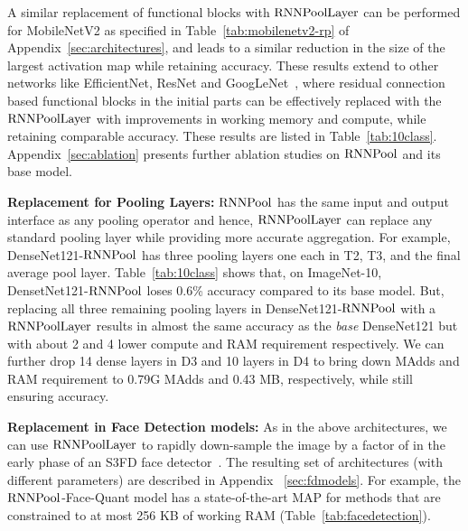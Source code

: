\documentclass[10pt]{article}
\newcommand{\rpool}{\ensuremath{{\rm RNNPool}}\xspace}
\newcommand{\rpoollayer}{\ensuremath{{\rm RNNPoolLayer}}\xspace}
\begin{document}
A similar replacement of functional blocks with \rpoollayer can be
performed for MobileNetV2 as specified in
Table~\ref{tab:mobilenetv2-rp} of Appendix~\ref{sec:architectures},
and leads to a similar reduction in the size of the largest activation
map while retaining accuracy.  These results extend to other networks
like EfficientNet, ResNet and GoogLeNet~\citep{szegedy2015going},
where residual connection based functional blocks in the initial parts
can be effectively replaced with the \rpoollayer with improvements in
working memory and compute, while retaining comparable accuracy. These
results are listed in
Table~\ref{tab:10class}. Appendix~\ref{sec:ablation} presents further
ablation studies on \rpool and its base model.


\textbf{Replacement for Pooling Layers:} \rpool has the same input and
output interface as any pooling operator and hence, \rpoollayer can
replace any standard pooling layer while providing more accurate
aggregation.  For example, DenseNet121-\rpool has three pooling layers
one each in T2, T3, and the final average pool layer.
Table~\ref{tab:10class} shows that, on ImageNet-10,
DensetNet121-\rpool loses 0.6\% accuracy compared to its base
model. But, replacing all three remaining pooling layers in
DenseNet121-\rpool with a \rpoollayer results in almost the same accuracy
as the {\em base} DenseNet121 but with about 2 and 4
lower compute and RAM requirement respectively.  We can further drop
14 dense layers in D3 and 10 layers in D4 to bring down MAdds and RAM
requirement to 0.79G MAdds and 0.43 MB, respectively, while still
ensuring  accuracy.

\label{sec:introface}
\textbf{Replacement in Face Detection models:} As in the above
architectures, we can use \rpoollayer to rapidly down-sample the image
by a factor of  in the early phase of an S3FD face
detector~\citep{zhang2017s3fd}. The resulting set of architectures
(with different parameters) are described in Appendix
~\ref{sec:fdmodels}. For example, the \rpool-Face-Quant model has a
state-of-the-art MAP for methods that are constrained to at most 256
KB of working RAM (Table~\ref{tab:facedetection}).
\end{document}
